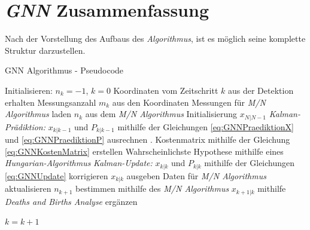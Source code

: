\documentclass[10pt,a4paper]{article}
\begin{document}
\section{\textit{GNN} Zusammenfassung}
Nach der Vorstellung des Aufbaus des \textit{Algorithmus}, ist es möglich seine komplette Struktur darzustellen.\\
\begin{algorithm}
\caption{GNN Algorithmus - Pseudocode}
\label{alg:GNNAlgorithm}
\begin{algorithmic}[1]
\State Initialisieren: $n_k = -1$, $k = 0$
  \State Koordinaten vom Zeitschritt $k$ aus der Detektion erhalten
  \State Messungsanzahl $m_k$ aus den Koordinaten
  \State Messungen für \textit{M/N Algorithmus} laden
  \EndIf
  \State $n_k$ aus dem \textit{M/N Algorithmus}
  \State Initialisierung $x_{N|N-1}$
  \EndIf
          \State \textit{Kalman-Prädiktion: }$x_{k|k-1}$ und $P_{k|k-1}$  mithilfe der Gleichungen  \ref{eq:GNNPraediktionX} und                 \ref{eq:GNNPraediktionP} ausrechnen .
          \State Kostenmatrix mithilfe der Gleichung \eqref{eq:GNNKostenMatrix} erstellen 
          \State Wahrscheinlichste Hypothese mithilfe eines \textit{Hungarian-Algorithmus}
          \State \textit{Kalman-Update: }$x_{k|k}$ und $P_{k|k}$ mithilfe der Gleichungen \ref{eq:GNNUpdate} korrigieren
          \State $x_{k|k}$ ausgeben
      \EndFor
      \State Daten für \textit{M/N Algorithmus} aktualisieren
      \State $n_{k+1}$ bestimmen mithilfe des  \textit{M/N Algorithmus}
      \State $x_{k+1|k}$ mithilfe \textit{Deaths and Births Analyse} ergänzen
      
  \EndIf
  $k = k+1$
\EndWhile


\end{algorithmic}
\end{algorithm}
\end{document}
